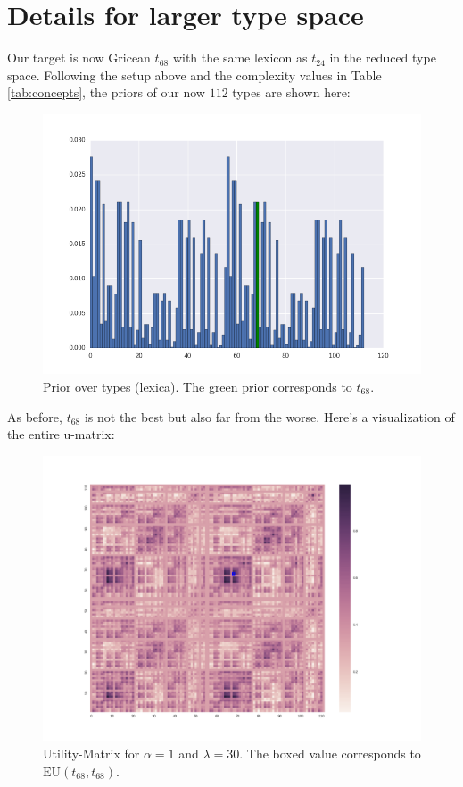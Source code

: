 \documentclass[a4paper]{article}
\begin{document}
\newpage

\section*{Details for larger type space}

Our target is now Gricean $t_{68}$ with the same lexicon as $t_{24}$ in the reduced type space. Following the setup above and the complexity values in Table \ref{tab:concepts}, the priors of our now $112$ types are shown here:

\begin{figure}[h!]
  \centering
  \includegraphics[scale=.35]{../code-LOT-extension/plots/priors-meFalse112.png} %
  \caption{Prior over types (lexica). The green prior corresponds to $t_{68}$.}
  \label{fig:priors}
\end{figure}

As before,  $t_{68}$ is not the best but also far from the worse. Here's a visualization of the entire u-matrix:

\begin{figure}[h!]
  \centering
  \includegraphics[scale=.25]{../code-LOT-extension/plots/u-l30-a1-meFalse112.png} %
  \caption{Utility-Matrix for $\alpha = 1$ and $\lambda = 30$. The boxed value corresponds to $\text{EU}(t_{68},t_{68})$.}
  \label{fig:u-matrix}
\end{figure}
\end{document}
